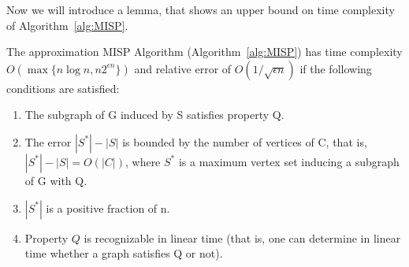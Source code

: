 Now we will introduce a lemma, that shows an upper bound on time complexity
of Algorithm~\ref{alg:MISP}.
\begin{lemma}\label{lem:MISP-upperbound} \cite{chibaApplicationsLiptonTarjans1981}
    The approximation \textsc{MISP} Algorithm (Algorithm~\ref{alg:MISP}) has time
	complexity $O(\max\{{n\log n, n2^{\epsilon n}\}})$ and relative error of
	$O(1/\sqrt{\epsilon n})$ if the following conditions are satisfied:
	\begin{enumerate}
		\item The subgraph of G induced by S satisfies property Q.
		\item The error $|S^{*}| - |S|$ is bounded by the number of vertices
		      of C, that is, $|S^{*}| - |S| = O(|C|)$, where $S^{*}$ is a maximum
		      vertex set inducing a subgraph of G with Q.
		\item $|S^*|$ is a positive fraction of n.
		\item Property $Q$ is recognizable in linear time (that is, one can
		      determine in linear time whether a graph satisfies Q or not).
	\end{enumerate}
\end{lemma}
